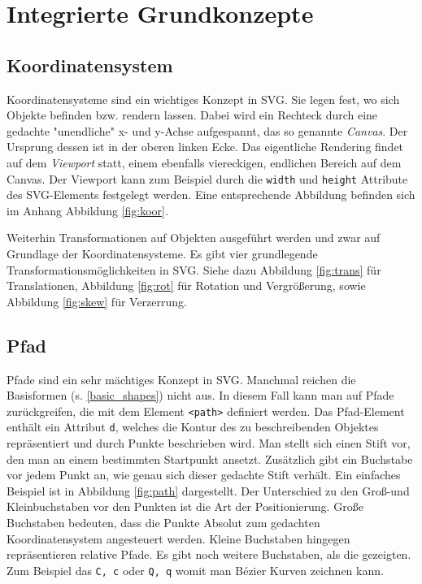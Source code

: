 \section{Integrierte Grundkonzepte}

\subsection{Koordinatensystem}
Koordinatensysteme sind ein wichtiges Konzept in SVG. Sie legen fest, wo sich Objekte befinden bzw. rendern lassen. Dabei wird ein Rechteck durch eine gedachte "unendliche" x- und y-Achse aufgespannt, das so genannte \emph{Canvas}. Der Ursprung dessen ist in der oberen linken Ecke.
Das eigentliche Rendering findet auf dem \emph{Viewport} statt, einem ebenfalls viereckigen, endlichen Bereich auf dem Canvas. Der Viewport kann zum Beispiel durch die \texttt{width} und \texttt{height} Attribute des SVG-Elements festgelegt werden.
Eine entsprechende Abbildung befinden sich im Anhang Abbildung \ref{fig:koor}.

Weiterhin Transformationen auf Objekten ausgeführt werden und zwar auf Grundlage der Koordinatensysteme. Es gibt vier grundlegende Transformationsmöglichkeiten in SVG. Siehe dazu Abbildung \ref{fig:trans} für Translationen, Abbildung \ref{fig:rot} für Rotation und Vergrößerung, sowie Abbildung \ref{fig:skew} für Verzerrung.

\subsection{Pfad}
Pfade sind ein sehr mächtiges Konzept in SVG. Manchmal reichen die Basisformen (s. \ref{basic_shapes}) nicht aus. In diesem Fall kann man auf Pfade zurückgreifen, die mit dem Element \texttt{<path>} definiert werden.
Das Pfad-Element enthält ein Attribut \texttt{d}, welches die Kontur des zu beschreibenden Objektes repräsentiert und durch Punkte beschrieben wird. Man stellt sich einen Stift vor, den man an einem bestimmten Startpunkt ansetzt. Zusätzlich gibt ein Buchstabe vor jedem Punkt an, wie genau sich dieser gedachte Stift verhält. Ein einfaches Beispiel ist in Abbildung \ref{fig:path} dargestellt.
Der Unterschied zu den Groß-und Kleinbuchstaben vor den Punkten ist die Art der Positionierung. Große Buchstaben bedeuten, dass die Punkte Absolut zum gedachten Koordinatensystem angesteuert werden. Kleine Buchstaben hingegen repräsentieren relative Pfade. Es gibt noch weitere Buchstaben, als die gezeigten. Zum Beispiel das \texttt{C, c} oder \texttt{Q, q} womit man Bézier Kurven zeichnen kann.

